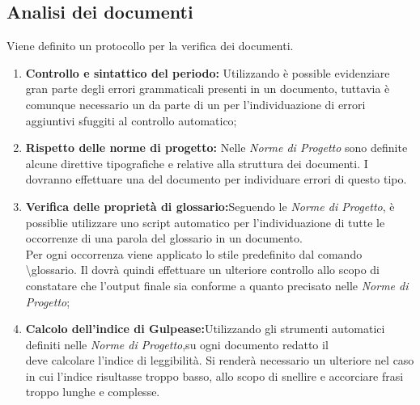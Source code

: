 \subsection{Analisi dei documenti}
Viene definito un protocollo per la verifica dei documenti.
\begin{enumerate}
	\item \textbf{Controllo e sintattico del periodo:} Utilizzando  è possible evidenziare gran parte degli errori grammaticali presenti in un documento, tuttavia è comunque necessario un  da parte di un  per l'individuazione di errori aggiuntivi sfuggiti al controllo automatico;
	\item \textbf{Rispetto delle norme di progetto:} Nelle \textit{Norme di Progetto} sono definite alcune direttive tipografiche e relative alla struttura dei documenti.
	I  dovranno effettuare una  del documento per individuare errori di questo tipo.
	\item \textbf{Verifica delle proprietà di glossario:}Seguendo le \textit{Norme di Progetto}, è possiblie utilizzare uno script automatico per l'individuazione di tutte le occorrenze di una parola del glossario in un documento.\\
	Per ogni occorrenza viene applicato lo stile  predefinito dal comando \textbackslash glossario.
	Il  dovrà quindi effettuare un ulteriore controllo allo scopo di constatare che l’output finale sia conforme a quanto precisato nelle \textit{Norme di Progetto};
	\item \textbf{Calcolo dell'indice di Gulpease:}Utilizzando gli strumenti automatici definiti nelle \textit{Norme di Progetto},su ogni documento redatto il \\  deve calcolare l’indice di leggibilità.
	Si renderà necessario un ulteriore  nel caso in cui l’indice risultasse troppo basso, allo scopo di snellire e accorciare frasi troppo lunghe e complesse.
\end{enumerate}
